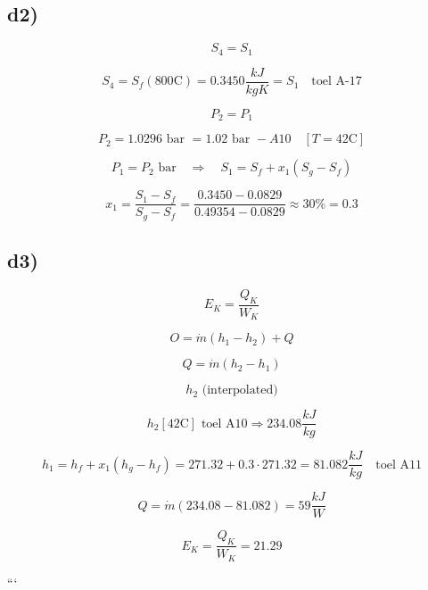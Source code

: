 \subsection*{d2)}
\[
S_4 = S_1
\]

\[
S_4 = S_f(800 \text{C}) = 0.3450 \frac{kJ}{kg K} = S_1 \quad \text{toel A-17}
\]

\[
P_2 = P_1
\]

\[
P_2 = 1.0296 \text{ bar } = 1.02 \text{ bar } - A10 \quad [T = 42 \text{C}]
\]

\[
P_1 = P_2 \text{ bar} \quad \Rightarrow \quad S_1 = S_f + x_1 (S_g - S_f)
\]

\[
x_1 = \frac{S_1 - S_f}{S_g - S_f} = \frac{0.3450 - 0.0829}{0.49354 - 0.0829} \approx 30\% = 0.3
\]

\subsection*{d3)}
\[
E_K = \frac{Q_K}{W_K}
\]

\[
O = \dot{m} (h_1 - h_2) + Q
\]

\[
Q = \dot{m} (h_2 - h_1)
\]

\[
h_2 \text{ (interpolated)}
\]

\[
h_2 [42 \text{C}] \text{ toel A10} \Rightarrow 234.08 \frac{kJ}{kg}
\]

\[
h_1 = h_f + x_1 (h_g - h_f) = 271.32 + 0.3 \cdot 271.32 = 81.082 \frac{kJ}{kg} \quad \text{toel A11}
\]

\[
Q = \dot{m} (234.08 - 81.082) = 59 \frac{kJ}{W}
\]

\[
E_K = \frac{Q_K}{W_K} = 21.29
\]

```